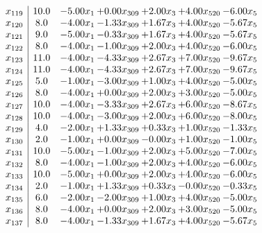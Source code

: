 \documentclass[8pt]{article}
\begin{document}
\[\begin{array}{c| c c@{\hskip 2pt} c@{\hskip 2pt} c@{\hskip 2pt} c@{\hskip 2pt} c@{\hskip 2pt} }
 x_{119}   &  10.0 & -5.00 x_{1} & +  0.00 x_{309} & +  2.00 x_{3} & +  4.00 x_{520} & -6.00 x_{5}\\
 x_{120}   &  8.0 & -4.00 x_{1} & -1.33 x_{309} & +  1.67 x_{3} & +  4.00 x_{520} & -5.67 x_{5}\\
 x_{121}   &  9.0 & -5.00 x_{1} & -0.33 x_{309} & +  1.67 x_{3} & +  4.00 x_{520} & -5.67 x_{5}\\
 x_{122}   &  8.0 & -4.00 x_{1} & -1.00 x_{309} & +  2.00 x_{3} & +  4.00 x_{520} & -6.00 x_{5}\\
 x_{123}   &  11.0 & -4.00 x_{1} & -4.33 x_{309} & +  2.67 x_{3} & +  7.00 x_{520} & -9.67 x_{5}\\
 x_{124}   &  11.0 & -4.00 x_{1} & -4.33 x_{309} & +  2.67 x_{3} & +  7.00 x_{520} & -9.67 x_{5}\\
 x_{125}   &  5.0 & -1.00 x_{1} & -3.00 x_{309} & +  1.00 x_{3} & +  4.00 x_{520} & -5.00 x_{5}\\
 x_{126}   &  8.0 & -4.00 x_{1} & +  0.00 x_{309} & +  2.00 x_{3} & +  3.00 x_{520} & -5.00 x_{5}\\
 x_{127}   &  10.0 & -4.00 x_{1} & -3.33 x_{309} & +  2.67 x_{3} & +  6.00 x_{520} & -8.67 x_{5}\\
 x_{128}   &  10.0 & -4.00 x_{1} & -3.00 x_{309} & +  2.00 x_{3} & +  6.00 x_{520} & -8.00 x_{5}\\
 x_{129}   &  4.0 & -2.00 x_{1} & +  1.33 x_{309} & +  0.33 x_{3} & +  1.00 x_{520} & -1.33 x_{5}\\
 x_{130}   &  2.0 & -1.00 x_{1} & +  0.00 x_{309} & -0.00 x_{3} & +  1.00 x_{520} & -1.00 x_{5}\\
 x_{131}   &  10.0 & -5.00 x_{1} & -1.00 x_{309} & +  2.00 x_{3} & +  5.00 x_{520} & -7.00 x_{5}\\
 x_{132}   &  8.0 & -4.00 x_{1} & -1.00 x_{309} & +  2.00 x_{3} & +  4.00 x_{520} & -6.00 x_{5}\\
 x_{133}   &  10.0 & -5.00 x_{1} & +  0.00 x_{309} & +  2.00 x_{3} & +  4.00 x_{520} & -6.00 x_{5}\\
 x_{134}   &  2.0 & -1.00 x_{1} & +  1.33 x_{309} & +  0.33 x_{3} & -0.00 x_{520} & -0.33 x_{5}\\
 x_{135}   &  6.0 & -2.00 x_{1} & -2.00 x_{309} & +  1.00 x_{3} & +  4.00 x_{520} & -5.00 x_{5}\\
 x_{136}   &  8.0 & -4.00 x_{1} & +  0.00 x_{309} & +  2.00 x_{3} & +  3.00 x_{520} & -5.00 x_{5}\\
 x_{137}   &  8.0 & -4.00 x_{1} & -1.33 x_{309} & +  1.67 x_{3} & +  4.00 x_{520} & -5.67 x_{5}\\

\end{array}\]
\end{document}
